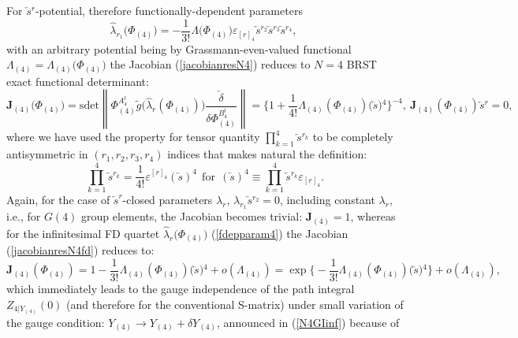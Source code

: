 \documentclass[10pt]{article}
\begin{document}
 For $\overleftarrow{s}{}^r$-potential, therefore functionally-dependent  parameters
\begin{equation}
\hat{\lambda}_{r_1}\big({\Phi}_{(4)}\big)=- \frac{1}{3!}\Lambda \big({\Phi}_{(4)}\big)\varepsilon
_{[r]_4}\overleftarrow{s}{}^{r_2}
\overleftarrow{s}{}^{r_3}\overleftarrow{s}{}^{r_4},\
\label{fdepparam4}
\end{equation}%
with an arbitrary potential being by  Grassmann-even-valued functional $\Lambda_{(4)} = \Lambda_{(4)}\big({\Phi}_{(4)}\big)$
the Jacobian (\ref{jacobianresN4}) reduces  to $N=4$ BRST exact functional determinant:
\begin{equation}
\mathbf{J}_{(4)}\big({\Phi}_{(4)}\big) = \mathrm{sdet}\left\|{\Phi}{}^{A^t_4}_{(4)}\tilde{g}\big(\hat{\lambda}_r({\Phi}_{(4)})\big)\frac{\overleftarrow{\delta}}{\delta {\Phi}{}^{B^t_4}_{(4)}} \right\| =  \Big\{1 + \frac{1}{4!}\Lambda_{(4)} ({\Phi}_{(4)}) \big(\overleftarrow{s}\big){}^{4}\Big\}^{-4}, \ \mathbf{J}_{(4)}({\Phi}_{(4)})\overleftarrow{s}{}^r = 0,
\label{jacobianresN4fd}
\end{equation}%
where we have used the property for tensor quantity $\prod_{k=1}^4\overleftarrow{s}{}^{r_k}$  to be  completely antisymmetric in  $(r_1,r_2,r_3, r_4)$  indices  that makes natural the definition:
\begin{equation}\label{s4pres}
\prod_{k=1}^4\overleftarrow{s}{}^{r_k}  = \frac{1}{4!}\varepsilon
^{[r]_4} \left(\overleftarrow{s}\right)^4 \ \ \mathrm{for} \ \  \left(\overleftarrow{s}\right)^4 \equiv     \prod_{k=1}^4\overleftarrow{s}{}^{r_k} \varepsilon
_{[r]_4}.
\end{equation}
Again,  for the  case of $\overleftarrow{s}^r$-closed parameters ${\lambda}_r$,
${\lambda}_{r_1}\overleftarrow{s}{}^{r_2} = 0$, including constant ${\lambda}_r$,
i.e., for $G(4)$ group elements, the Jacobian becomes trivial: $\mathbf{J}_{(4)}=1$, whereas for the infinitesimal FD quartet $\hat{\lambda}_r\big({\Phi}_{(4)}\big)$ (\ref{fdepparam4})
the Jacobian (\ref{jacobianresN4fd}) reduces to:
\begin{equation}
\mathbf{J}_{(4)}({\Phi}_{(4)}) = 1 - \frac{1}{3!}\Lambda_{(4)} ({\Phi}_{(4)})\big(\overleftarrow{s}\big){}^{4} +o(\Lambda_{(4)}) = \exp\Big\{- \frac{1}{3!}\Lambda_{(4)} ({\Phi}_{(4)})\big(\overleftarrow{s}\big){}^{4}\Big\}+o(\Lambda_{(4)}),
\label{jN4fdinf}
\end{equation}%
which immediately leads to  the gauge independence of the path integral ${Z}_{4|Y_{(4)}}(0)$ (and therefore for the conventional S-matrix) under small variation of the gauge condition: $Y_{(4)} \to Y_{(4)}+\delta Y_{(4)}$,  announced in  (\ref{N4GIinf}) because of
\end{document}
